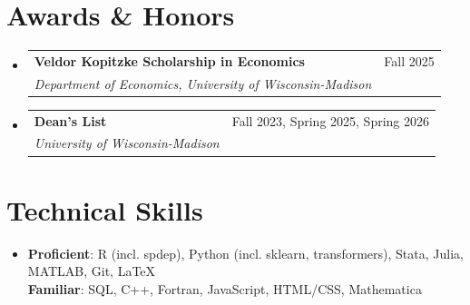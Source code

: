 \documentclass[letterpaper,11pt]{article}
\makeatletter
\newcommand{\resumeSubheading}[4]{\vspace{-2pt}\item
  \begin{tabular*}{0.97\textwidth}[t]{l@{\extracolsep{\fill}}r}
    \textbf{#1} & #2 \\
    \textit{\small#3} & \textit{\small #4} \\
  \end{tabular*}\vspace{-7pt}}
\newcommand{\resumeSubHeadingListStart}{\begin{itemize}[leftmargin=0.15in, label={}]}
\newcommand{\resumeSubHeadingListEnd}{\end{itemize}}
\makeatother
\begin{document}
\section{Awards \& Honors}
\resumeSubHeadingListStart

\vspace{0.5mm}

\resumeSubheading{Veldor Kopitzke Scholarship \textnormal{in Economics}}{Fall 2025}{Department of Economics, University of Wisconsin-Madison}{}

\vspace{1mm}

\resumeSubheading{Dean's List}{Fall 2023, Spring 2025, Spring 2026}{University of Wisconsin-Madison}{}

\vspace{2.5mm}


\resumeSubHeadingListEnd

\vspace{-5mm}
\section{Technical Skills}
 \begin{itemize}[leftmargin=0.15in, label={}]
    \item{
     \textbf{Proficient}{: R (incl. spdep), Python (incl. sklearn, transformers), Stata, Julia, MATLAB, Git, \LaTeX} \\
     \textbf{Familiar}{: SQL, C++, Fortran, JavaScript, HTML/CSS, Mathematica}
     }
 \end{itemize}
\end{document}

